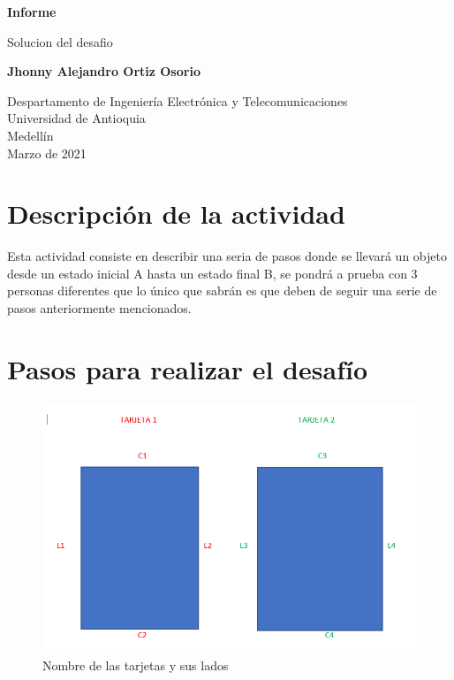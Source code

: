 \documentclass{article}
\begin{document}
\begin{titlepage}
    \begin{center}
        \vspace*{1cm}
            
        \Huge
        \textbf{Informe}
            
        \vspace{0.5cm}
        \LARGE
        Solucion del desafio
            
        \vspace{1.5cm}
            
        \textbf{Jhonny Alejandro Ortiz Osorio}
            
        \vfill
            
        \vspace{0.8cm}
            
        \Large
        Despartamento de Ingeniería Electrónica y Telecomunicaciones\\
        Universidad de Antioquia\\
        Medellín\\
        Marzo de 2021
            
    \end{center}
\end{titlepage}

\tableofcontents
\newpage
\section{Descripción de la actividad}\label{intro}
Esta actividad consiste en describir una seria de pasos donde se llevará un objeto desde un estado inicial A hasta un estado final B, se pondrá a prueba con 3 personas diferentes que lo único que sabrán es que deben de seguir una serie de pasos anteriormente mencionados.

\section{Pasos para realizar el desafío} \label{contenido}
\begin{figure}[h]
\includegraphics[width=15cm]{Tarjetas.png}
\centering
\caption{Nombre de las tarjetas y sus lados}
\label{fig:tar}
\end{figure}
\end{document}
